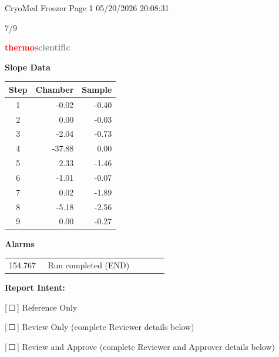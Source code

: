 \documentclass[UTF8,10pt,a4paper,fontset=fandol]{ctexart}
\newcommand{\fieldvalue}[1]{#1}
\newcommand{\handwritten}[1]{#1}
\newcommand{\checkboxfield}[1]{\ifstrequal{#1}{checked}{☑}{\ifstrequal{#1}{unclear}{?}{☐}}}
\begin{document}
\vfill

\begin{center}
CryoMed Freezer \hfill Page 1 \hfill 05/20/2026 20:08:31
\end{center}

\handwritten{7/9}

\newpage

\begin{flushright}
\textcolor{red}{\textbf{thermo}}\textcolor{gray}{\textbf{scientific}}
\end{flushright}

\noindent
\begin{minipage}[t]{0.38\linewidth}
\textbf{Slope Data}

\medskip
\begin{tabular}{c r r}
\hline
Step & Chamber & Sample \\
\hline
1 & -0.02 & -0.40 \\
2 & 0.00 & -0.03 \\
3 & -2.04 & -0.73 \\
4 & -37.88 & 0.00 \\
5 & 2.33 & -1.46 \\
6 & -1.01 & -0.07 \\
7 & 0.02 & -1.89 \\
8 & -5.18 & -2.56 \\
9 & 0.00 & -0.27 \\
\end{tabular}
\end{minipage}
\hfill
\begin{minipage}[t]{0.48\linewidth}
\textbf{Alarms}

\medskip
\begin{tabular}{p{0.22\linewidth} p{0.68\linewidth}}
154.767 & Run completed (END)
\end{tabular}
\end{minipage}

\bigskip

\textbf{Report Intent:}

[\,\fieldvalue{\checkboxfield{unchecked}}\,] Reference Only

[\,\fieldvalue{\checkboxfield{unchecked}}\,] Review Only (complete Reviewer details below)

[\,\fieldvalue{\checkboxfield{unchecked}}\,] Review and Approve (complete Reviewer and Approver details below)
\end{document}
